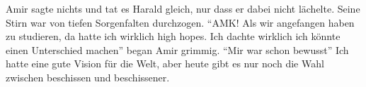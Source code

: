 Amir sagte nichts und tat es Harald gleich, nur dass er dabei nicht lächelte. Seine Stirn war von tiefen Sorgenfalten durchzogen. “AMK! Als wir angefangen haben zu studieren, da hatte ich wirklich high hopes. Ich dachte wirklich ich könnte einen Unterschied machen” began Amir grimmig.
“Mir war schon bewusst”  
Ich hatte eine gute Vision für die Welt, aber heute gibt es nur noch die Wahl zwischen beschissen und beschissener.





